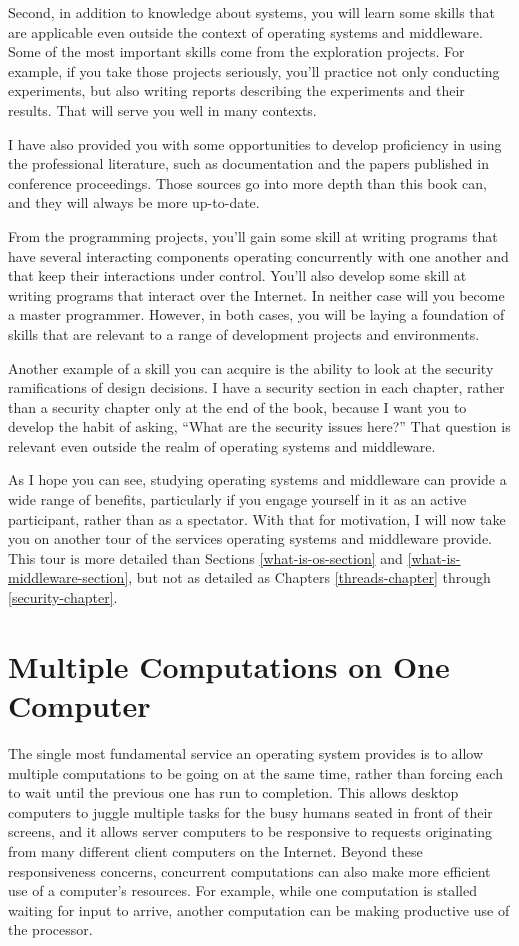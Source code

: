 Second, in addition to knowledge about systems, you will learn some
skills that are applicable even outside the context of operating
systems and middleware.  Some of the most important skills come from the
exploration projects.  For example, if you take those projects
seriously, you'll practice not only conducting experiments, but also
writing reports describing the experiments and their results.  That
will serve you well in many contexts.

I have also
provided you with some opportunities to develop proficiency in using the
professional literature, such as
documentation and the papers published in conference proceedings.
Those sources go into more depth than this book can, and they will
always be more up-to-date.

From the programming projects, you'll gain some skill at writing
programs that have several interacting components operating
concurrently with one another and that keep their interactions under
control.  You'll also develop some skill at writing programs that
interact over the Internet.  In neither case will you become a master
programmer.  However, in both cases, you will be laying a foundation of
skills that are relevant to a range of development projects and
environments.

Another example of a skill you can acquire is the ability to look at
the security ramifications of design decisions.  I have
a security section in each chapter, rather than a security
chapter only at the end of the book, because I want you to develop the
habit of asking, ``What are the security issues here?''  That question
is relevant even outside the realm of operating systems and
middleware.

As I hope you can see, studying operating systems and middleware can
provide a wide range of benefits, particularly if you engage yourself
in it as an active participant, rather than as a spectator.  With that
for motivation, I will now take you on another tour of the services
operating systems and middleware provide.  This tour is more detailed than
Sections \ref{what-is-os-section} and
\ref{what-is-middleware-section}, but not as detailed as Chapters
\ref{threads-chapter} through \ref{security-chapter}.

\section{Multiple Computations on One Computer}\label{concurrency-section}

The single most fundamental service an operating system provides is to
allow multiple computations to be going on at the same time, rather
than forcing each to wait until the previous one has run to
completion.  This allows desktop computers to juggle multiple tasks
for the busy humans seated in front of their screens, and it allows
server computers to be responsive to requests originating from many
different client computers on the Internet.  Beyond these
responsiveness concerns, concurrent computations can also make more
efficient use of a computer's resources.  For example, while one
computation is stalled waiting for input to arrive, another
computation can be making productive use of the processor.


